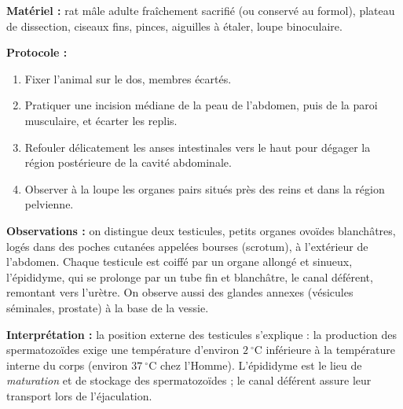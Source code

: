 \documentclass[11pt]{article}
\newcommand{\cle}[1]{{\popxbold\color{popdark}#1}}
\begin{document}
\begin{experience}
\textbf{Matériel :} rat mâle adulte fraîchement sacrifié (ou conservé au formol), plateau de dissection, ciseaux fins, pinces, aiguilles à étaler, loupe binoculaire.

\textbf{Protocole :}
\begin{enumerate}
\item Fixer l'animal sur le dos, membres écartés.
\item Pratiquer une incision médiane de la peau de l'abdomen, puis de la paroi musculaire, et écarter les replis.
\item Refouler délicatement les anses intestinales vers le haut pour dégager la région postérieure de la cavité abdominale.
\item Observer à la loupe les organes pairs situés près des reins et dans la région pelvienne.
\end{enumerate}

\textbf{Observations :} on distingue deux \cle{testicules}, petits organes ovoïdes blanchâtres, logés dans des poches cutanées appelées \cle{bourses} (scrotum), à l'extérieur de l'abdomen. Chaque testicule est coiffé par un organe allongé et sinueux, l'\cle{épididyme}, qui se prolonge par un tube fin et blanchâtre, le \cle{canal déférent}, remontant vers l'urètre. On observe aussi des glandes annexes (vésicules séminales, prostate) à la base de la vessie.

\textbf{Interprétation :} la position externe des testicules s'explique : la production des spermatozoïdes exige une température d'environ $2\ ^\circ\mathrm{C}$ inférieure à la température interne du corps (environ $37\ ^\circ\mathrm{C}$ chez l'Homme). L'épididyme est le lieu de \emph{maturation} et de stockage des spermatozoïdes ; le canal déférent assure leur transport lors de l'éjaculation.
\end{experience}
\end{document}

